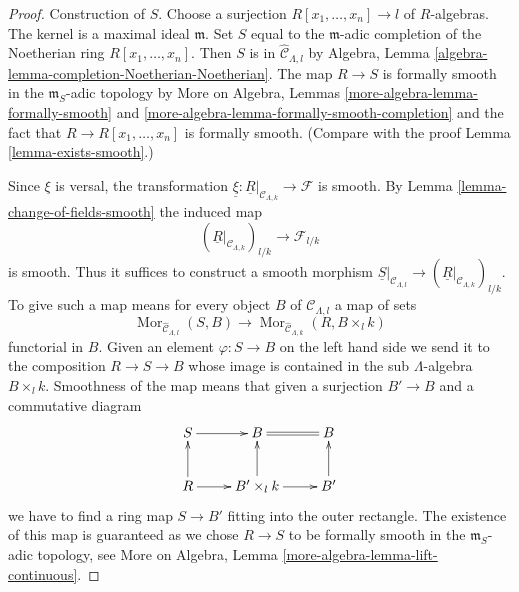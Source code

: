 \documentclass[10pt,a4paper]{amsart}
\theoremstyle{plain}
\theoremstyle{definition}
\theoremstyle{remark}
\numberwithin{equation}{subsection}
\def\Mor{\mathop{\mathrm{Mor}}\nolimits}
\begin{document}
\begin{proof}
Construction of $S$. Choose a surjection $R[x_1, \ldots, x_n] \to l$
of $R$-algebras. The kernel is a maximal ideal $\mathfrak m$.
Set $S$ equal to the $\mathfrak m$-adic completion of the Noetherian ring
$R[x_1, \ldots, x_n]$. Then $S$ is in $\widehat{\mathcal{C}}_{\Lambda, l}$
by Algebra, Lemma \ref{algebra-lemma-completion-Noetherian-Noetherian}.
The map $R \to S$ is formally smooth in the $\mathfrak m_S$-adic topology by
More on Algebra, Lemmas
\ref{more-algebra-lemma-formally-smooth} and
\ref{more-algebra-lemma-formally-smooth-completion}
and the fact that $R \to R[x_1, \ldots, x_n]$ is formally smooth.
(Compare with the proof Lemma \ref{lemma-exists-smooth}.)

\medskip\noindent
Since $\xi$ is versal, the transformation
$\underline{\xi} : \underline{R}|_{\mathcal{C}_{\Lambda, k}} \to \mathcal{F}$
is smooth. By Lemma \ref{lemma-change-of-fields-smooth} the induced map
$$
(\underline{R}|_{\mathcal{C}_{\Lambda, k}})_{l/k}
\longrightarrow
\mathcal{F}_{l/k}
$$
is smooth. Thus it suffices to construct a smooth morphism
$\underline{S}|_{\mathcal{C}_{\Lambda, l}} \to
(\underline{R}|_{\mathcal{C}_{\Lambda, k}})_{l/k}$.
To give such a map means for every object $B$ of $\mathcal{C}_{\Lambda, l}$
a map of sets
$$
\Mor_{\widehat{\mathcal{C}}_{\Lambda, l}}(S, B)
\longrightarrow
\Mor_{\widehat{\mathcal{C}}_{\Lambda, k}}(R, B \times_l k)
$$
functorial in $B$. Given an element $\varphi : S \to B$
on the left hand side we send it to the composition $R \to S \to B$
whose image is contained in the sub $\Lambda$-algebra $B \times_l k$.
Smoothness of the map means that given a surjection
$B' \to B$ and a commutative diagram
$$
\xymatrix{
S \ar[r] & B \ar@{=}[r] & B \\
R \ar[u] \ar[r] & B' \times_l k \ar[u] \ar[r] & B' \ar[u]
}
$$
we have to find a ring map $S \to B'$ fitting into the outer rectangle.
The existence of this map is guaranteed as we chose $R \to S$ to be
formally smooth in the $\mathfrak m_S$-adic topology, see
More on Algebra, Lemma \ref{more-algebra-lemma-lift-continuous}.
\end{proof}
\end{document}

